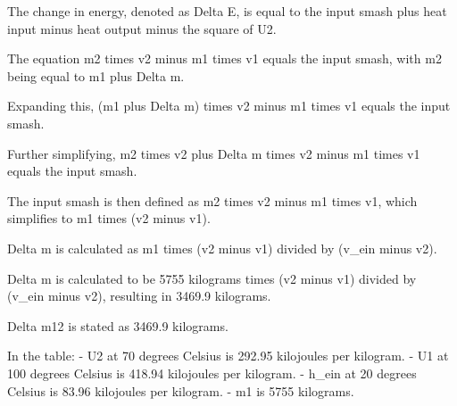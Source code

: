 The change in energy, denoted as Delta E, is equal to the input smash plus heat input minus heat output minus the square of U2.

The equation m2 times v2 minus m1 times v1 equals the input smash, with m2 being equal to m1 plus Delta m.

Expanding this, (m1 plus Delta m) times v2 minus m1 times v1 equals the input smash.

Further simplifying, m2 times v2 plus Delta m times v2 minus m1 times v1 equals the input smash.

The input smash is then defined as m2 times v2 minus m1 times v1, which simplifies to m1 times (v2 minus v1).

Delta m is calculated as m1 times (v2 minus v1) divided by (v_ein minus v2).

Delta m is calculated to be 5755 kilograms times (v2 minus v1) divided by (v_ein minus v2), resulting in 3469.9 kilograms.

Delta m12 is stated as 3469.9 kilograms.

In the table:
- U2 at 70 degrees Celsius is 292.95 kilojoules per kilogram.
- U1 at 100 degrees Celsius is 418.94 kilojoules per kilogram.
- h_ein at 20 degrees Celsius is 83.96 kilojoules per kilogram.
- m1 is 5755 kilograms.